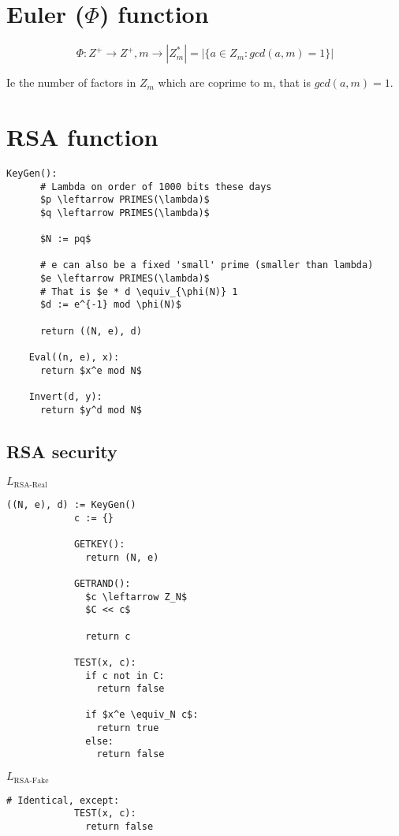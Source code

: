 \documentclass[a4paper]{scrreprt}
\begin{document}
\section{Euler ($\Phi$) function}

\[
	\Phi: Z^{+} \rightarrow Z^{+}, m \rightarrow |Z^{*}_m| = |\{a \in Z_m : gcd(a, m) = 1\}|
\]

Ie the number of factors in $Z_m$ which are coprime to m, that is $gcd(a, m) =
1$.

\section{RSA function}

\begin{lstlisting}[mathescape=true,autogobble=true]
	KeyGen():
	  # Lambda on order of 1000 bits these days
	  $p \leftarrow PRIMES(\lambda)$
	  $q \leftarrow PRIMES(\lambda)$

	  $N := pq$

	  # e can also be a fixed 'small' prime (smaller than lambda)
	  $e \leftarrow PRIMES(\lambda)$
	  # That is $e * d \equiv_{\phi(N)} 1
	  $d := e^{-1} mod \phi(N)$

	  return ((N, e), d)

	Eval((n, e), x):
	  return $x^e mod N$

	Invert(d, y):
	  return $y^d mod N$
\end{lstlisting}


\subsection{RSA security}


\begin{tcbraster}[raster columns=2,raster equal height,nobeforeafter,raster column skip=2cm]
	\begin{library}{$L_{\text{RSA-Real}}$}
		\begin{lstlisting}[mathescape=true,autogobble=true]
			((N, e), d) := KeyGen()
			c := {}

			GETKEY():
			  return (N, e)

			GETRAND():
			  $c \leftarrow Z_N$
			  $C << c$

			  return c

			TEST(x, c):
			  if c not in C:
			    return false

			  if $x^e \equiv_N c$:
			    return true
			  else:
			    return false
		\end{lstlisting}
	\end{library}
	\begin{library}{$L_{\text{RSA-Fake}}$}
		\begin{lstlisting}[mathescape=true,autogobble=true]
			# Identical, except:
			TEST(x, c):
			  return false
		\end{lstlisting}
	\end{library}
\end{tcbraster}
\end{document}
